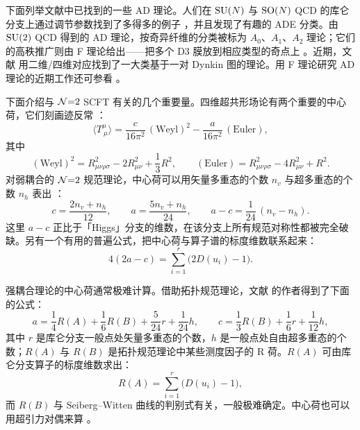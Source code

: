下面列举文献中已找到的一些 AD 理论。人们在 $\operatorname{SU}(N)$ 与 $\operatorname{SO}(N)$ QCD 的库仑分支上通过调节参数找到了多得多的例子 \cite{12,13}，并且发现了有趣的 ADE 分类。由 $\operatorname{SU}(2)$ QCD 得到的 AD 理论，按奇异纤维的分类被标为 $A_0$、$A_1$、$A_2$ 理论；它们的高秩推广则由 F 理论给出——把多个 D3 膜放到相应类型的奇点上 \cite{14,15,16}。近期，文献 \cite{17} 用二维/四维对应找到了一大类基于一对 Dynkin 图的理论。用 F 理论研究 AD 理论的近期工作还可参看 \cite{18}。

下面介绍与 $\mathcal{N}{=}2$ SCFT 有关的几个重要量。四维超共形场论有两个重要的中心荷，它们刻画迹反常 \cite{19}：
\begin{equation}
\langle T^\mu_{\ \mu}\rangle = \frac{c}{16\pi^2}\,(\text{Weyl})^2 - \frac{a}{16\pi^2}\,(\text{Euler}),
\label{eq:2.4}\tag{2.4}
\end{equation}
其中
\begin{equation}
(\text{Weyl})^2 = R^2_{\mu\nu\rho\sigma} - 2R^2_{\mu\nu} + \frac{1}{3}R^2,\qquad
(\text{Euler}) = R^2_{\mu\nu\rho\sigma} - 4R^2_{\mu\nu} + R^2 .
\label{eq:2.5}\tag{2.5}
\end{equation}
对弱耦合的 $\mathcal{N}{=}2$ 规范理论，中心荷可以用矢量多重态的个数 $n_v$ 与超多重态的个数 $n_h$ 表出 \cite{20}：
\begin{equation}
c = \frac{2n_v + n_h}{12},\qquad
a = \frac{5n_v + n_h}{24},\qquad
a - c = \frac{1}{24}\,(n_v - n_h).
\label{eq:2.6}\tag{2.6}
\end{equation}
这里 $a-c$ 正比于「Higgs」分支的维数，在该分支上所有规范对称性都被完全破缺。另有一个有用的普遍公式，把中心荷与算子谱的标度维数联系起来：
\begin{equation}
4(2a - c) = \sum_{i=1}^{r}\bigl(2D(u_i) - 1\bigr).
\label{eq:2.7}\tag{2.7}
\end{equation}

强耦合理论的中心荷通常极难计算。借助拓扑规范理论，文献 \cite{20} 的作者得到了下面的公式：
\begin{equation}
a = \frac{1}{4}R(A) + \frac{1}{6}R(B) + \frac{5}{24}r + \frac{1}{24}h,\qquad
c = \frac{1}{3}R(B) + \frac{1}{6}r + \frac{1}{12}h,
\label{eq:2.8}\tag{2.8}
\end{equation}
其中 $r$ 是库仑分支一般点处矢量多重态的个数，$h$ 是一般点处自由超多重态的个数；$R(A)$ 与 $R(B)$ 是拓扑规范理论中某些测度因子的 R 荷。$R(A)$ 可由库仑分支算子的标度维数求出：
\begin{equation}
R(A) = \sum_{i=1}^{r}\bigl(D(u_i) - 1\bigr),
\label{eq:2.9}\tag{2.9}
\end{equation}
而 $R(B)$ 与 Seiberg--Witten 曲线的判别式有关，一般极难确定。中心荷也可以用超引力对偶来算 \cite{21}。

